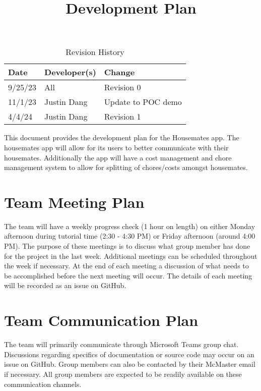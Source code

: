 \documentclass{article}
\title{Development Plan\\\progname}
\author{\authname}
\date{}
\begin{document}
\maketitle

\begin{table}[hp]
\caption{Revision History} \label{TblRevisionHistory}
\begin{tabularx}{\textwidth}{llX}
\toprule
\textbf{Date} & \textbf{Developer(s)} & \textbf{Change}\\
\midrule
9/25/23 & All & Revision 0\\
11/1/23 & Justin Dang & Update to POC demo\\
4/4/24 & Justin Dang & Revision 1\\
\bottomrule
\end{tabularx}
\end{table}


This document provides the development plan for the Housemates app. The housemates app will allow for its users to better communicate with their housemates.  Additionally the app will have a cost management and chore management system to allow for splitting of chores/costs amongst housemates.

\section{Team Meeting Plan}

The team will have a weekly progress check (1 hour on length) on either Monday afternoon during tutorial time (2:30 - 4:30 PM) or Friday afternoon (around 4:00 PM). The purpose of these meetings is to discuss what group member has done for the project in the last week. Additional meetings can be scheduled throughout the week if necessary. At the end of each meeting a discussion of what needs to be accomplished before the next meeting will occur. The details of each meeting will be recorded as an issue on GitHub.


\section{Team Communication Plan}

The team will primarily communicate through Microsoft Teams group chat. Discussions regarding specifics of documentation or source code may occur on an issue on GitHub. Group members can also be contacted by their McMaster email if necessary. All group members are expected to be readily available on these communication channels.
\end{document}
